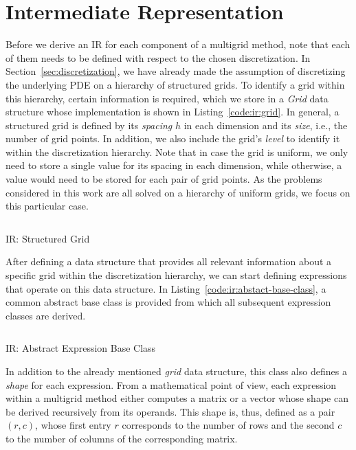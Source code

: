 \section{Intermediate Representation}
\label{sec:intermediate-representation}
Before we derive an IR for each component of a multigrid method, note that each of them needs to be defined with respect to the chosen discretization.
In Section~\ref{sec:discretization}, we have already made the assumption of discretizing the underlying PDE on a hierarchy of structured grids.
To identify a grid within this hierarchy, certain information is required, which we store in a \emph{Grid} data structure whose implementation is shown in Listing~\ref{code:ir:grid}.
In general, a structured grid is defined by its \emph{spacing} $h$ in each dimension and its \emph{size}, i.e., the number of grid points.
In addition, we also include the grid's \emph{level} to identify it within the discretization hierarchy.
Note that in case the grid is uniform, we only need to store a single value for its spacing in each dimension, while otherwise, a value would need to be stored for each pair of grid points.
As the problems considered in this work are all solved on a hierarchy of uniform grids, we focus on this particular case.
\begin{listing}
	\inputminted{python}{evostencils/ir/grid.py}
	\caption{IR: Structured Grid}
	\label{code:ir:grid}
\end{listing}
After defining a data structure that provides all relevant information about a specific grid within the discretization hierarchy, we can start defining expressions that operate on this data structure.
In Listing~\ref{code:ir:abstact-base-class}, a common abstract base class is provided from which all subsequent expression classes are derived.
\begin{listing}
	\inputminted{python}{evostencils/ir/expression.py}
	\caption{IR: Abstract Expression Base Class}
	\label{code:ir:abstact-base-class}
\end{listing}
In addition to the already mentioned \emph{grid} data structure, this class also defines a \emph{shape} for each expression.
From a mathematical point of view, each expression within a multigrid method either computes a matrix or a vector whose shape can be derived recursively from its operands.
This shape is, thus, defined as a pair $(r, c)$, whose first entry $r$ corresponds to the number of rows and the second $c$ to the number of columns of the corresponding matrix.
